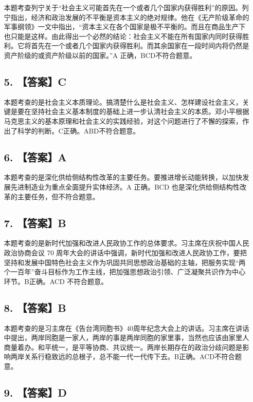 \documentclass[UTF8,11pt]{ctexart}
\begin{document}
本题考查列宁关于“社会主义可能首先在一个或者几个国家内获得胜利”的原因。列宁指出，经济和政治发展的不平衡是资本主义的绝对规律。他在《无产阶级革命的军事纲领》一文中指出，“资本主义在各个国家是极不平衡的。而且在商品生产下也只能是这样。由此得出一个必然的结论：社会主义不能在所有国家内同时获得胜利。它将首先在一个或者几个国家内获得胜利。而其余国家在一段时间内将仍然是资产阶级的或资产阶级以前的国家。”A 正确，BCD不符合题意。


\subsection*{5. 【答案】C}

本题考查的是社会主义本质理论。搞清楚什么是社会主义、怎样建设社会主义，关键是要在坚持社会主义基本制度的基础上进一步认清社会主义的本质。邓小平根据马克思主义的基本原理和社会主义的实践经验，对这个问题进行了不懈的探索，作出了科学的判断。C正确。ABD不符合题意。


\subsection*{6. 【答案】A}

本题考查的是深化供给侧结构性改革的主要任务。要推进增长动能转换，以加快发展先进制造业为重点全面提升实体经济。A 正确。BCD 也是深化供给侧结构性改革的主要任务，但不符合题意。


\subsection*{7. 【答案】B}

本题考查的是新时代加强和改进人民政协工作的总体要求。习主席在庆祝中国人民政治协商会议 70 周年大会的讲话中强调，新时代加强和改进人民政协工作，要把坚持和发展中国特色社会主义作为巩固共同思想政治基础的主轴，把服务实现“两个一百年”奋斗目标作为工作主线，把加强思想政治引领、广泛凝聚共识作为中心环节。B正确。ACD 不符合题意。


\subsection*{8. 【答案】B}

本题考查的是习主席在《告台湾同胞书》40周年纪念大会上的讲话。习主席在讲话中提出，两岸同胞是一家人，两岸的事是两岸同胞的家里事，当然也应该由家里人商量着办。和平统一，是平等协商、共议统一。两岸长期存在的政治分歧问题是影响两岸关系行稳致远的总根子，总不能一代一代传下去。B正确。ACD不符合题意。


\subsection*{9. 【答案】D}
\end{document}

